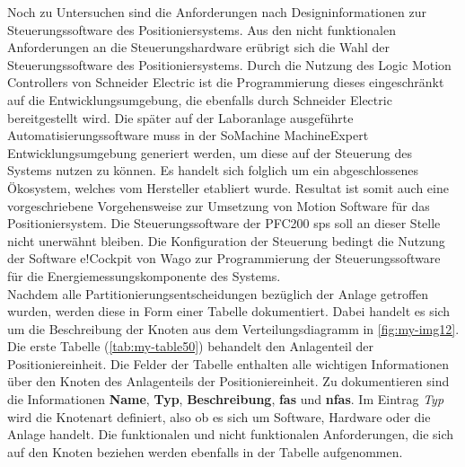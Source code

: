 \documentclass[../../../Bachelorarbeit.tex]{subfiles}
\begin{document}
Noch zu Untersuchen sind die Anforderungen nach Designinformationen zur Steuerungssoftware des Positioniersystems. Aus den nicht funktionalen Anforderungen an die Steuerungshardware erübrigt sich die Wahl der Steuerungssoftware des Positioniersystems. Durch die Nutzung des Logic Motion Controllers von Schneider Electric ist die Programmierung dieses eingeschränkt auf die Entwicklungsumgebung, die ebenfalls durch Schneider Electric bereitgestellt wird. Die später auf der Laboranlage ausgeführte Automatisierungssoftware muss in der SoMachine \bzw MachineExpert Entwicklungsumgebung generiert werden, um diese auf der Steuerung des Systems nutzen zu können. Es handelt sich folglich um ein abgeschlossenes Ökosystem, welches vom Hersteller etabliert wurde. Resultat ist somit auch eine vorgeschriebene Vorgehensweise zur Umsetzung von Motion Software für das Positioniersystem. Die Steuerungssoftware der PFC200 \ac{sps} soll an dieser Stelle nicht unerwähnt bleiben. Die Konfiguration der Steuerung bedingt die Nutzung der Software e!Cockpit von Wago zur Programmierung der Steuerungssoftware für die Energiemessungskomponente des Systems.\\
Nachdem alle Partitionierungsentscheidungen bezüglich der Anlage getroffen wurden, werden diese in Form einer Tabelle dokumentiert. Dabei handelt es sich um die Beschreibung der Knoten aus dem Verteilungsdiagramm in \autoref{fig:my-img12}.\\
Die erste Tabelle (\autoref{tab:my-table50}) behandelt den Anlagenteil der Positioniereinheit. Die Felder der Tabelle enthalten alle wichtigen Informationen über den Knoten des Anlagenteils der Positioniereinheit. Zu dokumentieren sind die Informationen \textbf{Name}, \textbf{Typ}, \textbf{Beschreibung}, \textbf{\acp{fa}} und \textbf{\acp{nfa}}. Im Eintrag \textit{Typ} wird die Knotenart definiert, also ob es sich um Software, Hardware oder die Anlage handelt. Die funktionalen und nicht funktionalen Anforderungen, die sich auf den Knoten beziehen werden ebenfalls in der Tabelle aufgenommen.
\end{document}
